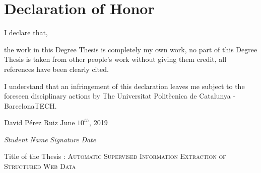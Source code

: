 \documentclass[../main.tex]{subfiles}
\begin{document}
\section*{Declaration of Honor}

\vspace{1em}

I declare that,

\vspace{1em}

the work in this Degree Thesis is completely my own work, no part of this Degree Thesis is taken from other people’s work without giving them credit, all references have been clearly cited.

\vspace{1em}

I understand that an infringement of this declaration leaves me subject to the foreseen disciplinary actions by The Universitat Politècnica de Catalunya - BarcelonaTECH.

\vspace{6em}

David Pérez Ruiz    \hspace{9cm}     June $10^{th}$, 2019

\vspace{2em}

\textit{Student Name}    \hspace{4.5cm}    \textit{Signature}       \hspace{4.5cm} \textit{Date}

\vspace{10em}

Title of the Thesis : \textsc{\large{Automatic Supervised Information Extraction of Structured Web Data}}
\end{document}
